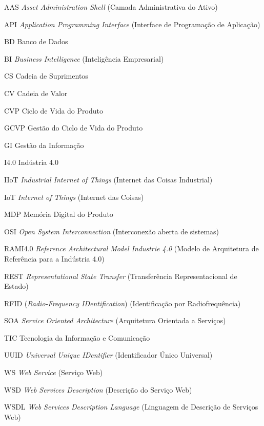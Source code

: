 \begin{siglas}
	\item[AAS] \textit{Asset Administration Shell} (Camada Administrativa do Ativo)
	\item[API] \textit{Application Programming Interface} (Interface de Programação de Aplicação)
	\item[BD] Banco de Dados
	\item[BI] \textit{Business Intelligence} (Inteligência Empresarial)
	\item[CS] Cadeia de Suprimentos
	\item[CV] Cadeia de Valor
	\item[CVP] Ciclo de Vida do Produto
	\item[GCVP] Gestão do Ciclo de Vida do Produto
	\item[GI] Gestão da Informação
	\item[I4.0] Indústria 4.0
	\item[IIoT] \textit{Industrial Internet of Things} (Internet das Coisas Industrial)
	\item[IoT] \textit{Internet of Things} (Internet das Coisas)
	\item[MDP] Memória Digital do Produto
	\item[OSI] \textit{Open System Interconnection} (Interconexão aberta de sistemas)
	\item[RAMI4.0] \textit{Reference Architectural Model Industrie 4.0} (Modelo de Arquitetura de Referência para a Indústria 4.0)
	\item[REST] \textit{Representational State Transfer} (Transferência Representacional de Estado)
	\item[RFID] (\textit{Radio-Frequency IDentification}) (Identificação por Radiofrequência)
	\item[SOA] \textit{Service Oriented Architecture} (Arquitetura Orientada a Serviços)
  	\item[TIC] Tecnologia da Informação e Comunicação
  	\item[UUID] \textit{Universal Unique IDentifier} (Identificador Único Universal)
  	\item[WS] \textit{Web Service} (Serviço Web)
  	\item[WSD] \textit{Web Services Description} (Descrição do Serviço Web)
  	\item[WSDL] \textit{Web Services Description Language} (Linguagem de Descrição de Serviços Web)
\end{siglas}

\tableofcontents*
\cleardoublepage

